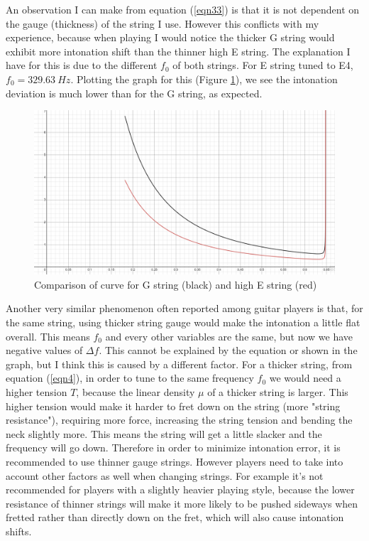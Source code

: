 \documentclass[11pt]{article}
\begin{document}
\begin{flushleft}
        An observation I can make from equation (\ref{eqn33}) is that it is not dependent on the gauge (thickness) of the string I use. However this conflicts with my experience, because when playing I would notice the thicker G string would exhibit more intonation shift than the thinner high E string. The explanation I have for this is due to the different $f_0$ of both strings. For E string tuned to E4, $f_0 = \SI{329.63}{Hz}$. Plotting the graph for this (Figure \ref{fig11}), we see the intonation deviation is much lower than for the G string, as expected.\par
        \FloatBarrier
        \begin{figure} [!htb]
            \includegraphics[width = \textwidth]{compare_graph_f.png} 
            \caption{Comparison of curve for G string (black) and high E string (red)}\label{fig11}
        \end{figure}
        Another very similar phenomenon often reported among guitar players is that, for the same string, using thicker string gauge would make the intonation a little flat overall. This means $f_0$ and every other variables are the same, but now we have negative values of $\Delta f$. This cannot be explained by the equation or shown in the graph, but I think this is caused by a different factor. For a thicker string, from equation (\ref{eqn4}), in order to tune to the same frequency $f_0$ we would need a higher tension $T$, because the linear density $\mu$ of a thicker string is larger. This higher tension would make it harder to fret down on the string (more "string resistance"), requiring more force, increasing the string tension and bending the neck slightly more. This means the string will get a little slacker and the frequency will go down. Therefore in order to minimize intonation error, it is recommended to use thinner gauge strings. However players need to take into account other factors as well when changing strings. For example it's not recommended for players with a slightly heavier playing style, because the lower resistance of thinner strings will make it more likely to be pushed sideways when fretted rather than directly down on the fret, which will also cause intonation shifts.\par
        

\end{flushleft}
\end{document}
